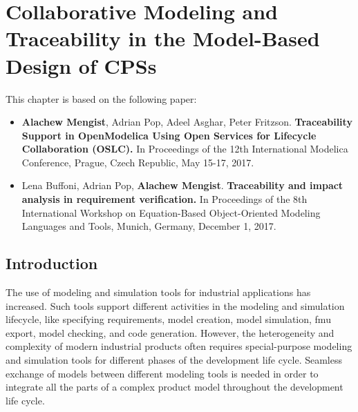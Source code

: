 

\chapter{Collaborative Modeling and Traceability in the Model-Based Design of CPSs}
\label{cha:traceability}


This chapter is based on the following paper:

\begin{itemize}
	
	\item  \textbf{Alachew Mengist}, Adrian Pop, Adeel Asghar, Peter Fritzson. \textbf{Traceability Support in OpenModelica Using Open Services for Lifecycle Collaboration (OSLC).} In Proceedings of the 12th International Modelica Conference, Prague, Czech Republic, May 15-17, 2017. 
	
	\item  Lena Buffoni, Adrian Pop, \textbf{Alachew Mengist}. \textbf{Traceability and impact analysis in requirement verification.} In Proceedings of the 8th International Workshop on Equation-Based Object-Oriented Modeling Languages and Tools, Munich, Germany, December 1, 2017. 
	
\end{itemize}

\section{Introduction}
\label{sec:tracaebilityintroduction}


The use of modeling and simulation tools for industrial applications has increased. Such tools support different 
activities in the modeling and simulation lifecycle, like specifying requirements, model creation, model simulation, \acrshort{fmu} 
export, model checking, and code generation. However, the heterogeneity and complexity of modern industrial products often requires special-purpose modeling and simulation tools for different phases of the development life cycle. Seamless exchange of models between different modeling tools
is needed in order to integrate all the parts of a complex product model throughout the development life cycle. 

